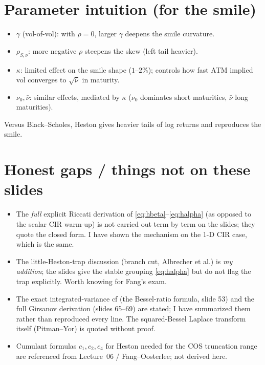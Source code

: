 \documentclass[11pt]{article}
\begin{document}
\section{Parameter intuition (for the smile)}

\begin{itemize}[noitemsep]
\item $\gamma$ (vol-of-vol): with $\rho=0$, larger $\gamma$ deepens the smile curvature.
\item $\rho_{S,\nu}$: more negative $\rho$ steepens the skew (left tail heavier).
\item $\kappa$: limited effect on the smile shape ($1$--$2\%$); controls how fast ATM
implied vol converges to $\sqrt{\bar\nu}$ in maturity.
\item $\nu_0,\bar\nu$: similar effects, mediated by $\kappa$ ($\nu_0$ dominates short
maturities, $\bar\nu$ long maturities).
\end{itemize}
Versus Black--Scholes, Heston gives heavier tails of log returns and reproduces the smile.

\section*{Honest gaps / things not on these slides}

\begin{itemize}[noitemsep]
\item The \emph{full} explicit Riccati derivation of \eqref{eq:hbeta}--\eqref{eq:halpha}
(as opposed to the scalar CIR warm-up) is not carried out term by term on the slides; they
quote the closed form. I have shown the mechanism on the 1-D CIR case, which is the same.
\item The little-Heston-trap discussion (branch cut, Albrecher et al.) is \emph{my
addition}; the slides give the stable grouping \eqref{eq:halpha} but do not flag the trap
explicitly. Worth knowing for Fang's exam.
\item The exact integrated-variance cf (the Bessel-ratio formula, slide 53) and the full
Girsanov derivation (slides 65--69) are stated; I have summarized them rather than
reproduced every line. The squared-Bessel Laplace transform itself (Pitman--Yor) is quoted
without proof.
\item Cumulant formulas $c_1,c_2,c_4$ for Heston needed for the COS truncation range are
referenced from Lecture~06 / Fang--Oosterlee; not derived here.
\end{itemize}
\end{document}
